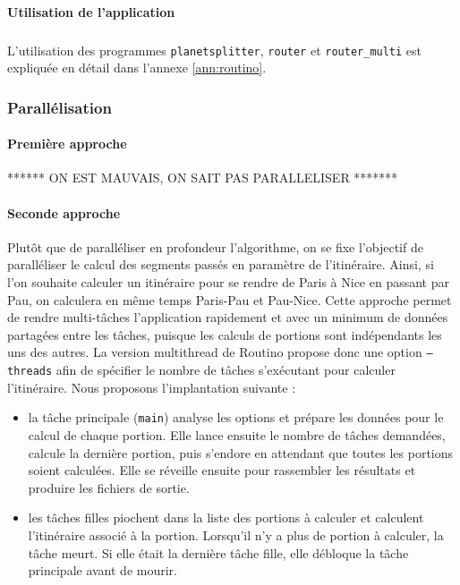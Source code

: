 \paragraph{Utilisation de l'application}
\subparagraph{}

L'utilisation des programmes \texttt{planetsplitter}, \texttt{router} et 
\texttt{router\_multi} est expliquée en détail dans l'annexe \ref{ann:routino}.

\subsubsection{Parallélisation}
\paragraph{Première approche}
******  ON EST MAUVAIS, ON SAIT PAS PARALLELISER *******\\

\paragraph{Seconde approche}
Plutôt que de paralléliser en profondeur l'algorithme, on se fixe l'objectif de
paralléliser le calcul des segments passés en paramètre de l'itinéraire. Ainsi,
si l'on souhaite calculer un itinéraire pour se rendre de Paris à Nice en
passant par Pau, on calculera en même temps Paris-Pau et Pau-Nice. Cette
approche permet de rendre multi-tâches l'application rapidement et avec un
minimum de données partagées entre les tâches, puisque les calculs de portions
sont indépendants les uns des autres. La version multithread de Routino propose
donc une option \texttt{--threads} afin de spécifier le nombre de tâches 
s'exécutant pour calculer l'itinéraire. Nous proposons l'implantation suivante :
\begin{itemize}
\renewcommand{\labelitemi}{$\bullet$}
\item la tâche principale (\texttt{main}) analyse les options et prépare les
  données pour le calcul de chaque portion. Elle lance ensuite le nombre de
  tâches demandées, calcule la dernière portion, puis s'endore en attendant que
  toutes les portions soient calculées. Elle se réveille ensuite pour rassembler
  les résultats et produire les fichiers de sortie.
\item les tâches filles piochent dans la liste des portions à calculer et
  calculent l'itinéraire associé à la portion. Lorsqu'il n'y a plus de portion
  à calculer, la tâche meurt. Si elle était la dernière tâche fille, elle
  débloque la tâche principale avant de mourir.
\end{itemize}
